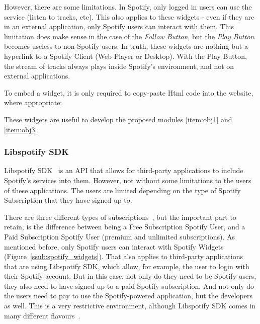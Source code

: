         However, there are some limitations.
        In Spotify, only logged in users can use the service (listen to tracks, etc).
        This also applies to these widgets - even if they are in an external application, only Spotify users can interact with them.
        This limitation does make sense in the case of the \emph{Follow Button}, but the \emph{Play Button} becomes useless to non-Spotify users.
        In truth, these widgets are nothing but a hyperlink to a Spotify Client (Web Player or Desktop).
        With the Play Button, the stream of tracks always plays inside Spotify's environment, and not on external applications.

        To embed a widget, it is only required to copy-paste Html code into the website, where appropriate:

        

        These widgets are useful to develop the proposed modules \ref{item:obj1} and \ref{item:obj3}.


      \subsubsection{Libspotify SDK} %
      \label{ssub:libspotify_sdk}

        Libspotify SDK~\cite{libspotifysdk} is an API that allows for third-party applications to include Spotify's services into them.
        However, not without some limitations to the users of these applications.
        The users are limited depending on the type of Spotify Subscription that they have signed up to.

        There are three different types of subscriptions~\cite{spsubscription}, but the important part to retain, is the difference between being a Free Subscription Spotify User, and a Paid Subscription Spotify User (premium and unlimited subscriptions).
        As mentioned before, only Spotify users can interact with Spotify Widgets (Figure~\ref{ssub:spotify_widgets}).
        That also applies to third-party applications that are using Libspotify SDK, which allow, for example, the user to login with their Spotify account.
        But in this case, not only do they need to be Spotify users, they also need to have signed up to a paid Spotify subscription.
        And not only do the users need to pay to use the Spotify-powered application, but the developers as well.
        This is a very restrictive environment, although Libspotify SDK comes in many different flavours~\cite{libspotifysdkdown}.

